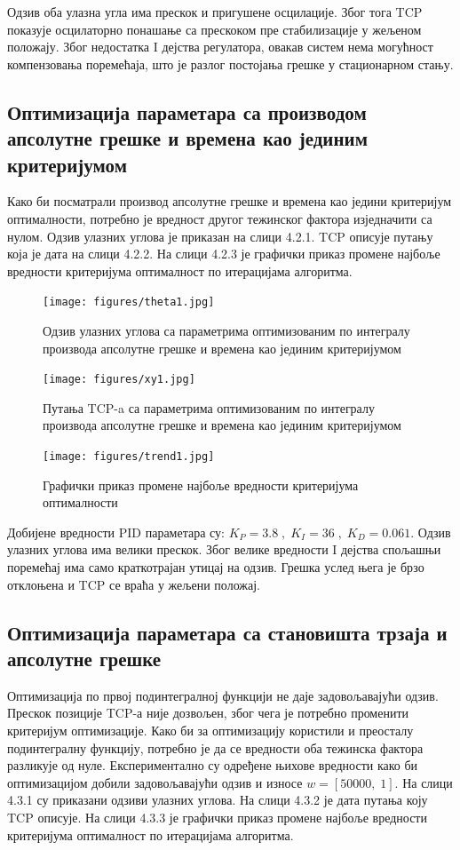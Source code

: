 \documentclass[12pt]{article}
\begin{document}
Одзив оба улазна угла има прескок и пригушене осцилације. Због тога TCP показује осцилаторно понашање са прескоком пре стабилизације у жељеном положају. Због недостатка I дејства регулатора, овакав систем нема могућност компензовања поремећаја, што је разлог постојања грешке у стационарном стању.

\subsection{Оптимизација параметара са производом апсолутне грешке и времена као јединим критеријумом}
Како би посматрали производ апсолутне грешке и времена као једини критеријум оптималности, потребно је вредност другог тежинског фактора изједначити са нулом. Одзив улазних углова је приказан на слици 4.2.1. TCP описује путању која је дата на слици 4.2.2. На слици 4.2.3 је графички приказ промене најбоље вредности критеријума оптималност по итерацијама алгоритма.

\begin{figure}[H]
    \centering
    \texttt{[image: figures/theta1.jpg]}
    \caption{Одзив улазних углова са параметрима оптимизованим по интегралу производа апсолутне грешке и времена као јединим критеријумом}
    \label{fig:w1_0_0_theta}
\end{figure}
\begin{figure}[H]
    \centering
    \texttt{[image: figures/xy1.jpg]}
    \caption{Путања TCP-a са параметрима оптимизованим по интегралу производа апсолутне грешке и времена као јединим критеријумом}
    \label{fig:w1_0_0_xy}
\end{figure}
\begin{figure}[H]
    \centering
    \texttt{[image: figures/trend1.jpg]}
    \caption{Графички приказ промене најбоље вредности критеријума оптималности}
    \label{fig:trend_1}
\end{figure}
Добијене вредности PID параметара су: $K_P=3.8\;,\;K_I=36\;,\;K_D=0.061$. Одзив улазних углова има велики прескок. Због велике вредности I дејства спољашњи поремећај има само краткотрајан утицај на одзив. Грешка услед њега је брзо отклоњена и TCP се враћа у жељени положај.

\subsection{Оптимизација параметара са становишта трзаја и апсолутне грешке}
Оптимизација по првој подинтегралној функцији не даје задовољавајући одзив. Прескок позиције TCP-а није дозвољен, због чега је потребно променити критеријум оптимизације.
Како би за оптимизацију користили и преосталу подинтегралну функцију, потребно је да се вредности оба тежинска фактора разликује од нуле. Експериментално су одређене њихове вредности како би оптимизацијом добили задовољавајући одзив и износе $w=[50000,\; 1]$. На слици 4.3.1 су приказани одзиви улазних углова. На слици 4.3.2 је дата путања коју TCP описује. На слици 4.3.3 је графички приказ промене најбоље вредности критеријума оптималност по итерацијама алгоритма.
\end{document}
